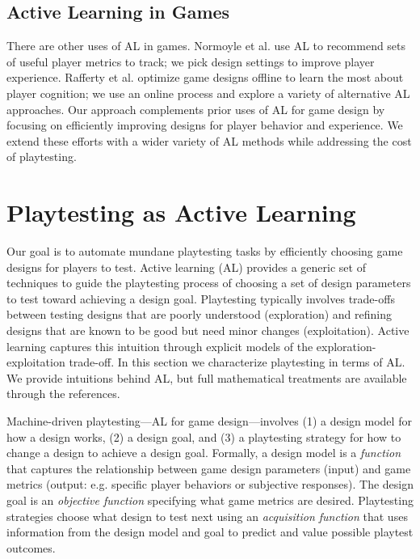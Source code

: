 \documentclass{sig-alternate}
\begin{document}
\subsection{Active Learning in Games}

There are other uses of AL in games.
Normoyle et al. \cite{normoyle2012:al-metrics} use AL to recommend sets of useful player metrics to track; we pick design settings to improve player experience.
Rafferty et al. \cite{rafferty2012:opt-cog-game} optimize game designs offline to learn the most about player cognition; we use an online process and explore a variety of alternative AL approaches.
Our approach complements prior uses of AL for game design by focusing on efficiently improving designs for player behavior and experience.
We extend these efforts with a wider variety of AL methods while addressing the cost of playtesting.



\section{Playtesting as Active Learning}

Our goal is to automate mundane playtesting tasks by efficiently choosing game designs for players to test.
Active learning (AL) provides a generic set of techniques to guide the playtesting process of choosing a set of design parameters to test toward achieving a design goal.
Playtesting typically involves trade-offs between testing designs that are poorly understood (exploration) and refining designs that are known to be good but need minor changes (exploitation).
Active learning captures this intuition through explicit models of the exploration-exploitation trade-off.
In this section we characterize playtesting in terms of AL.
We provide intuitions behind AL, but full mathematical treatments are available through the references.


Machine-driven playtesting---AL for game design---involves (1) a design model for how a design works, (2) a design goal, and (3) a playtesting strategy for how to change a design to achieve a design goal.
Formally, a design model is a \textit{function} that captures the relationship between game design parameters (input) and game metrics (output: e.g. specific player behaviors or subjective responses).
The design goal is an \textit{objective function} specifying what game metrics are desired.
Playtesting strategies choose what design to test next using an \textit{acquisition function} that uses information from the design model and goal to predict and value possible playtest outcomes.
\end{document}
